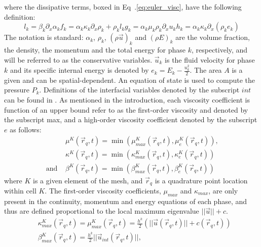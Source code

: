 \documentclass{anstrans}
\begin{document}
where the dissipative terms, boxed in Eq~.\ref{eq:euler_visc}, have the following definition:
\begin{subequations}
%
\begin{equation}
  l_k = \beta_k \partial_x \alpha_k 
\end{equation}
%  
\begin{equation}
  f_k = \alpha_k \kappa_k \partial_x \rho_k + \rho_k l_k 
\end{equation}
%  
\begin{equation}
  g_k = \alpha_k \mu_k \rho_k \partial_x u_k 
\end{equation}  
%
\begin{equation}
  h_k =  \alpha_k \kappa_k \partial_x \left( \rho_k e_k \right)
 \end{equation}
%
\end{subequations}
The notation is standard: $\alpha_k$, $\rho_k$, $(\rho \vec{u})_k$ and $(\rho E)_k$ are the volume fraction, the density, the momentum and the total energy for phase $k$, respectively, and will be referred to as the conservative variables. $\vec{u}_k$ is the fluid velocity for phase $k$ and its specific internal energy is denoted by $e_k=E_k-\tfrac{u^2_k}{2}$. The area $A$ is a given and can be spatial-dependent. An equation of state is used to compute the pressure $P_k$. Definitions of the interfacial variables denoted by the subscript $int$ can be found in \cite{berry}. As mentioned in the introduction, each viscosity coefficient is function of an upper bound refer to as the first-order viscosity and denoted by the subscript max, and a high-order viscosity coefficient denoted by the subscript $e$ as follows: 
%
\begin{align}
&\mu^K(\vec{r}_q,t) = \min ( \mu_{max}^K(\vec{r}_q,t), \mu_e^K(\vec{r}_q,t) ) \text{, } \nonumber \\
&\kappa^K(\vec{r}_q,t) = \min ( \kappa_{max}^K(\vec{r}_q,t), \kappa_e^K(\vec{r}_q,t) )\nonumber  \\ 
\text{ and } &\beta^K(\vec{r}_q,t) = \min ( \beta_{max}^K(\vec{r}_q,t), \beta_e^K(\vec{r}_q,t) ) \nonumber
\end{align}
%
where $K$ is a given element of the mesh, and $\vec{r}_q$ is a quadrature point location within cell $K$.
The first-order viscosity coefficients, $\mu_{max}$ and $\kappa_{max}$, are only present in the continuity, momentum and energy equations of each phase, and thus are defined proportional to the local maximum eigenvalue $|| \vec{u} || +c $. 
%
\begin{align}
&\kappa_{max}^K(\vec{r}_q,t) = \mu_{max}^K(\vec{r}_q,t) = \frac{h^k}{2} (|| \vec{u}(\vec{r}_q,t) || +c(\vec{r}_q,t) ) \nonumber \\
&\beta_{max}^K(\vec{r}_q,t) = \frac{h^k}{2} ||\vec{u}_{int}(\vec{r}_q,t) ||, \nonumber
\end{align}
\end{document}
